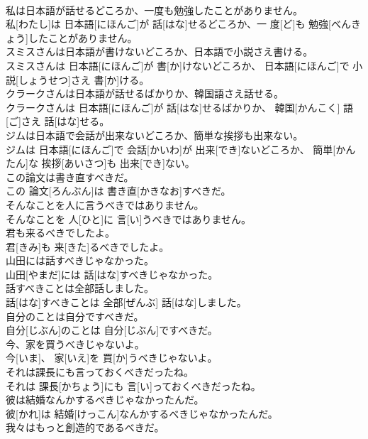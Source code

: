 \documentclass[8pt]{extreport}
\begin{document}
\begin{CJK}{UTF8}{min}
\\	私は日本語が話せるどころか、一度も勉強したことがありません。	
\\	私[わたし]は 日本語[にほんご]が 話[はな]せるどころか、一 度[ど]も 勉強[べんきょう]したことがありません。
\\	スミスさんは日本語が書けないどころか、日本語で小説さえ書ける。	
\\	スミスさんは 日本語[にほんご]が 書[か]けないどころか、 日本語[にほんご]で 小説[しょうせつ]さえ 書[か]ける。
\\	クラークさんは日本語が話せるばかりか、韓国語さえ話せる。	
\\	クラークさんは 日本語[にほんご]が 話[はな]せるばかりか、 韓国[かんこく] 語[ご]さえ 話[はな]せる。
\\	ジムは日本語で会話が出来ないどころか、簡単な挨拶も出来ない。	
\\	ジムは 日本語[にほんご]で 会話[かいわ]が 出来[でき]ないどころか、 簡単[かんたん]な 挨拶[あいさつ]も 出来[でき]ない。
\\	この論文は書き直すべきだ。	
\\	この 論文[ろんぶん]は 書き直[かきなお]すべきだ。
\\	そんなことを人に言うべきではありません。	
\\	そんなことを 人[ひと]に 言[い]うべきではありません。
\\	君も来るべきでしたよ。	
\\	君[きみ]も 来[きた]るべきでしたよ。
\\	山田には話すべきじゃなかった。	
\\	山田[やまだ]には 話[はな]すべきじゃなかった。
\\	話すべきことは全部話しました。	
\\	話[はな]すべきことは 全部[ぜんぶ] 話[はな]しました。
\\	自分のことは自分ですべきだ。	
\\	自分[じぶん]のことは 自分[じぶん]ですべきだ。
\\	今、家を買うべきじゃないよ。	
\\	今[いま]、 家[いえ]を 買[か]うべきじゃないよ。
\\	それは課長にも言っておくべきだったね。	
\\	それは 課長[かちょう]にも 言[い]っておくべきだったね。
\\	彼は結婚なんかするべきじゃなかったんだ。	
\\	彼[かれ]は 結婚[けっこん]なんかするべきじゃなかったんだ。
\\	我々はもっと創造的であるべきだ。	

\end{CJK}
\end{document}
